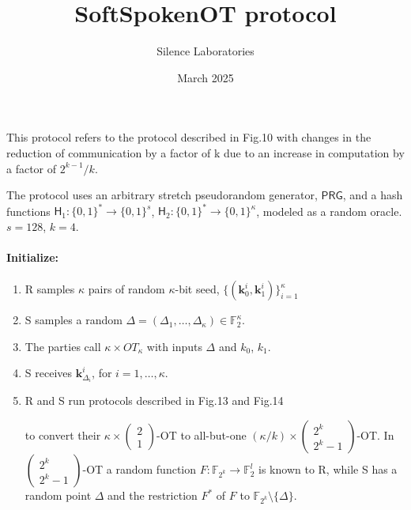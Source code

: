 \documentclass{article}
\title{SoftSpokenOT protocol}
\author{Silence Laboratories}
\date{March 2025}
\begin{document}
\maketitle
This protocol refers to the protocol described in Fig.10 \cite{keller2015actively} with changes in the
reduction of communication by a factor of k due to an increase in computation by a factor of $2^{k-1} / k$.

The protocol uses an arbitrary stretch pseudorandom generator, $\mathsf{PRG}$, and a hash functions 
$\mathsf{H}_1: \{0,1\}^* \rightarrow \{0,1\}^{s}$, $\mathsf{H}_2: \{0,1\}^* \rightarrow \{0,1\}^{\kappa}$, modeled as a random oracle. \\
$s = 128$, $k = 4$.

\paragraph{Initialize:}
    \begin{enumerate}
        \item R samples $\kappa$ pairs of random $\kappa$-bit seed, $\{(\bm{k}_0^i, \bm{k}_1^i)\}_{i=1}^{\kappa}$
        \item S samples a random $\Delta = (\Delta_1, \dots, \Delta_{\kappa}) \in \mathbb{F}_2^{\kappa}$.
        \item The parties call $\kappa \times OT_{\kappa}$ with inputs $\Delta$ and $k_0$, $k_1$.
        \item S receives $\bm{k}_{\Delta_i}^i$, for $i = 1, \dots, \kappa$.

        \item R and S run protocols described in Fig.13 and Fig.14 \cite{roy2022softspokenot}
        
        to convert their $\kappa \times \left(\begin{array}{c} 2 \\ 1 \end{array} \right)$-OT to all-but-one $(\kappa / k) \times \left(\begin{array}{c} 2^k \\ 2^k - 1 \end{array} \right)$-OT.
        In $\left(\begin{array}{c} 2^k \\ 2^k - 1 \end{array} \right)$-OT a random function $F: \mathbb{F}_{2^k} \rightarrow \mathbb{F}_2^{l}$ is known to R,
    while S has a random point $\Delta$ and the restriction $F^{*}$ of $F$ to $\mathbb{F}_{2^k} \setminus  \{\Delta\}$.
        
    \end{enumerate}
\end{document}
